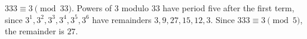 $333\equiv3\pmod{33}$. Powers of $3$ modulo $33$ have period five after the first term, since $3^1,3^2,3^3,3^4,3^5,3^6$ have remainders $3,9,27,15,12,3$. Since $333\equiv3\pmod5$, the remainder is $\boxed{27}$.
